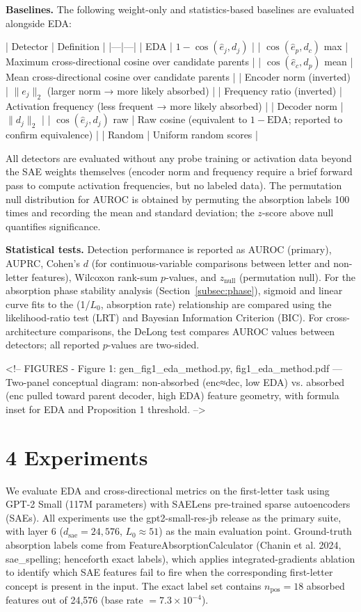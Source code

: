 \documentclass{article}
\begin{document}
\textbf{Baselines.} The following weight-only and statistics-based baselines are evaluated
alongside EDA:

| Detector | Definition |
|---|---|
| EDA | $1 - \cos(\hat{e}_j, d_j)$ |
| $\cos(\hat{e}_p, d_c)$ max | Maximum cross-directional cosine over candidate parents |
| $\cos(\hat{e}_c, d_p)$ mean | Mean cross-directional cosine over candidate parents |
| Encoder norm (inverted) | $\|e_j\|_2$ (larger norm → more likely absorbed) |
| Frequency ratio (inverted) | Activation frequency (less frequent → more likely absorbed) |
| Decoder norm | $\|d_j\|_2$ |
| $\cos(\hat{e}_j, d_j)$ raw | Raw cosine (equivalent to $1 - \text{EDA}$; reported to confirm equivalence) |
| Random | Uniform random scores |

All detectors are evaluated without any probe training or activation data beyond the SAE
weights themselves (encoder norm and frequency require a brief forward pass to compute
activation frequencies, but no labeled data). The permutation null distribution for AUROC
is obtained by permuting the absorption labels 100 times and recording the mean and standard
deviation; the $z$-score above null quantifies significance.

\textbf{Statistical tests.} Detection performance is reported as AUROC (primary), AUPRC, Cohen's
$d$ (for continuous-variable comparisons between letter and non-letter features), Wilcoxon
rank-sum $p$-values, and $z_\text{null}$ (permutation null). For the absorption phase
stability analysis (Section~\ref{subsec:phase}), sigmoid and linear curve fits to the
(1/$L_0$, absorption rate) relationship are compared using the likelihood-ratio test (LRT)
and Bayesian Information Criterion (BIC). For cross-architecture comparisons, the DeLong
test compares AUROC values between detectors; all reported $p$-values are two-sided.

<!-- FIGURES
- Figure 1: gen_fig1_eda_method.py, fig1_eda_method.pdf — Two-panel conceptual diagram: non-absorbed (enc≈dec, low EDA) vs. absorbed (enc pulled toward parent decoder, high EDA) feature geometry, with formula inset for EDA and Proposition 1 threshold.
-->


\section{4 Experiments}

We evaluate EDA and cross-directional metrics on the first-letter task using GPT-2 Small
(117M parameters) with SAELens pre-trained sparse autoencoders (SAEs).
All experiments use the gpt2-small-res-jb release as the primary suite, with layer 6
($d_\text{sae} = 24{,}576$, $L_0 \approx 51$) as the main evaluation point.
Ground-truth absorption labels come from FeatureAbsorptionCalculator
(Chanin et al. 2024, sae_spelling; henceforth exact labels), which applies integrated-gradients
ablation to identify which SAE features fail to fire when the corresponding first-letter concept
is present in the input.
The exact label set contains $n_\text{pos} = 18$ absorbed features out of 24,576
(base rate $= 7.3 \times 10^{-4}$).
\end{document}
